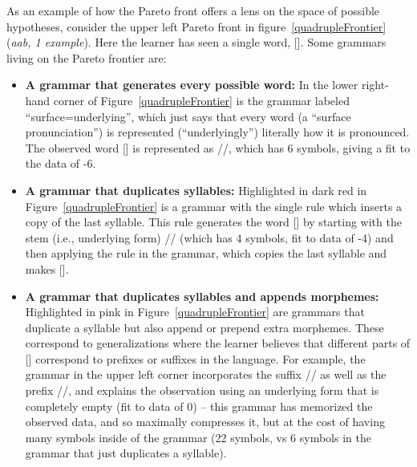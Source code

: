 \documentclass{article}
\begin{document}
As an example of how the Pareto front offers a lens on the
space of possible hypotheses,
consider the upper left Pareto front in figure~\ref{quadrupleFrontier} (\emph{aab, 1 example}).
Here the learner has seen a single word, [].
Some grammars living on the Pareto frontier are:
\begin{itemize}
\item \textbf{A grammar that generates every possible word:} In the lower right-hand corner of Figure~\ref{quadrupleFrontier}
  is the grammar labeled ``surface=underlying'',
  which just says that every word (a ``surface pronunciation'')
  is represented (``underlyingly'') literally how it is pronounced.
  The observed word [] is represented as //, which has 6 symbols,
  giving a fit to the data of -6.
\item \textbf{A grammar that duplicates syllables:} Highlighted in dark red in Figure~\ref{quadrupleFrontier}
  is a grammar with the single rule
  which inserts a copy of the last syllable.
  This rule generates the word [] by starting with the stem (i.e., underlying form) // (which has 4 symbols, fit to data of -4) and then applying the rule in the grammar,
  which copies the last syllable and makes [].
\item \textbf{A grammar that duplicates syllables and appends
  morphemes:} Highlighted in pink in Figure~\ref{quadrupleFrontier} are
  grammars that duplicate a syllable but also append or prepend extra
  morphemes.  These correspond to generalizations where the learner
  believes that different parts of [] correspond to
  prefixes or suffixes in the language.  For example, the grammar in
  the upper left corner incorporates the suffix // as well
  as the prefix //, and explains the observation using an
  underlying form that is completely empty (fit to data of 0) -- this
  grammar has memorized the observed data, and so maximally compresses
  it, but at the cost of having many symbols inside of the grammar (22 symbols, vs 6 symbols in the grammar that just duplicates a syllable).  
  \end{itemize}
\end{document}
